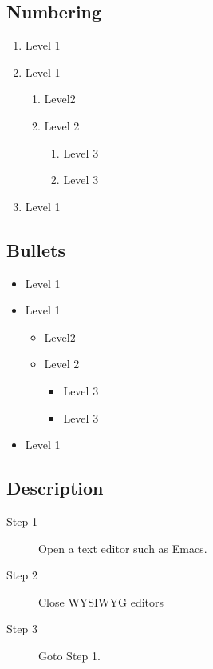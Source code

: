 \subsection{Numbering}
 
 
 \begin{enumerate}
  \item Level 1
  \item Level 1
  		\begin{enumerate}
  		 \item Level2
  		 \item Level 2
  		 		\begin{enumerate}
  		 		\item Level 3
  		 		\item Level 3
  				\end{enumerate}
  		\end{enumerate}
 \item Level 1
 \end{enumerate}
 
 \subsection{Bullets}
 
\begin{itemize}
  \item Level 1
  \item Level 1
  		\begin{itemize}
  		 \item Level2
  		 \item Level 2
  		 		\begin{itemize}
  		 		\item Level 3
  		 		\item Level 3
  				\end{itemize}
  		\end{itemize}
 \item Level 1
 \end{itemize}
 
 \subsection{Description}
 
 \begin{description}
  \item [Step 1] Open a text editor such as Emacs.
  \item [Step 2] Close WYSIWYG editors
  \item [Step 3] Goto Step 1.
 \end{description}
 
